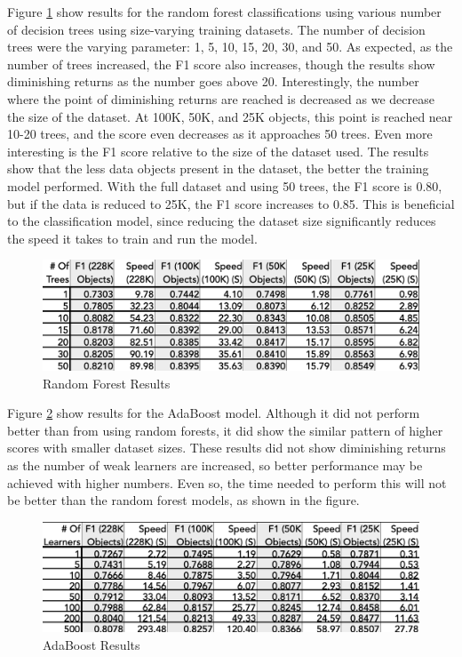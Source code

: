 \documentclass[11pt,sigconf]{acmart}
\begin{document}
Figure \ref{fig:randomforest} show results for the random forest classifications 
using various number of decision trees using size-varying training datasets. The 
number of decision trees were the varying parameter: 1, 5, 10, 15, 20, 30, and 50. 
As expected, as the number of trees increased, the F1 score also increases, though the 
results show diminishing returns as the number goes above 20. Interestingly, the 
number where the point of diminishing returns are reached is decreased as we 
decrease the size of the dataset. At 100K, 50K, and 25K objects, this point is 
reached near 10-20 trees, and the score even decreases as it approaches 50 trees. Even 
more interesting is the F1 score relative to the size of the dataset used. The 
results show that the less data objects present in the dataset, the better the training 
model performed. With the full dataset and using 50 trees, the F1 score is 0.80, but if 
the data is reduced to 25K, the F1 score increases to 0.85. This is beneficial 
to the classification model, since reducing the dataset size significantly reduces the 
speed it takes to train and run the model. 

\begin{figure}[htbp]
  \centering
  \includegraphics[scale=0.35]{randomforest}
  \caption{Random Forest Results}
  \label{fig:randomforest}
\end{figure}


Figure \ref{fig:adaboost} show results for the AdaBoost model. Although it did not 
perform better than from using random forests, it did show the similar pattern of 
higher scores with smaller dataset sizes. These results did not show diminishing returns 
as the number of weak learners are increased, so better performance may be achieved 
with higher numbers. Even so, the time needed to perform this will not be better than 
the random forest models, as shown in the figure.


\begin{figure}[htbp]
  \centering
  \includegraphics[scale=0.35]{adaboost}
  \caption{AdaBoost Results}
  \label{fig:adaboost}
\end{figure}
\end{document}
